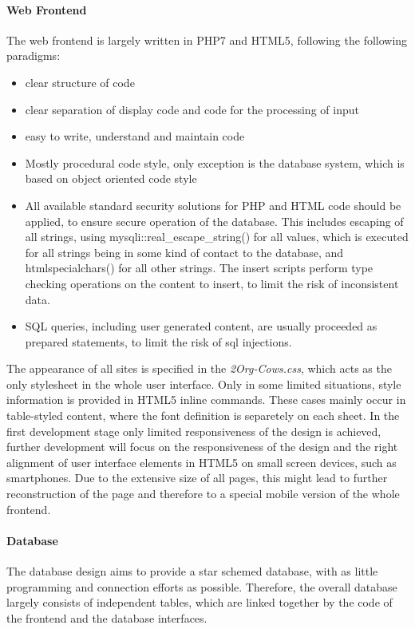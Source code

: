 \paragraph{Web Frontend}
The web frontend is largely written in PHP7 and HTML5, following the following paradigms: 
\begin{itemize}
 \item clear structure of code
 \item clear separation of display code and code for the processing of input
 \item easy to write, understand and maintain code
 \item Mostly procedural code style, only exception is the database system, which is based on object oriented code style
 \item All available standard security solutions for PHP and HTML code should be applied, to ensure secure operation of the database. This includes escaping of all strings, using 
 mysqli::real\_escape\_string() for all values, which is executed for all strings being in some kind of contact to the database, and htmlspecialchars() for all other strings. 
 The insert scripts perform type checking operations on the content to insert, to limit the risk of inconsistent data.
 \item SQL queries, including user generated content, are usually proceeded as prepared statements, to limit the risk of sql injections.
\end{itemize}
The appearance of all sites is specified in the \emph{2Org-Cows.css}, which acts as the only stylesheet in the whole user interface. Only in some limited situations, style information is 
provided in HTML5 inline commands. These cases mainly occur in table-styled content, where the font definition is separetely on each sheet.  
In the first development stage only limited responsiveness of the design is achieved, further development will focus on the responsiveness of the design
and the right alignment of user interface elements in HTML5 on small screen devices, such as smartphones. Due to the extensive size of all pages, this might lead to further 
reconstruction of the page and therefore to a special mobile version of the whole frontend.
\paragraph{Database}
The database design aims to provide a star schemed database, with as little programming and connection efforts as possible. Therefore, the overall database largely consists of 
independent tables, which are linked together by the code of the frontend and the database interfaces.
